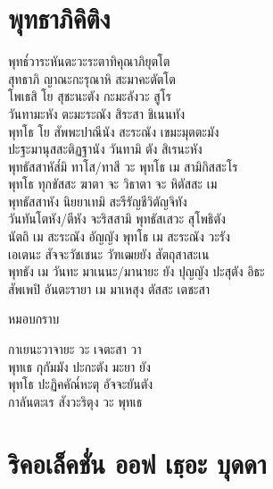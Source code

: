 \chapter{พุทธาภิคิติง}

\begin{leader}
\end{leader}

\begin{thaitrans}
พุทธ๎วาระหันตะวะระตาทิคุณาภิยุตโต\\
สุทธาภิ ญาณะกะรุณาหิ สะมาคะตัตโต\\
โพเธสิ โย สุชะนะตัง กะมะลังวะ สูโร\\
วันทามะหัง ตะมะระณัง สิระสา ชิเนนทัง\\
พุทโธ โย สัพพะปาณีนัง สะระณัง เขมะมุตตะมัง\\
ปะฐะมานุสสะติฏฐานัง วันทามิ ตัง สิเรนะหัง\\
พุทธัสสาหัส๎มิ ทาโส/ทาสี วะ พุทโธ เม สามิกิสสะโร\\
พุทโธ ทุกขัสสะ ฆาตา จะ วิธาตา จะ หิตัสสะ เม\\
พุทธัสสาหัง นิยยาเทมิ สะรีรัญชีวิตัญจิทัง\\
วันทันโตหัง/ตีหัง จะริสสามิ พุทธัสเสวะ สุโพธิตัง\\
นัตถิ เม สะระณัง อัญญัง พุทโธ เม สะระณัง วะรัง\\
เอเตนะ สัจจะวัชเชนะ วัฑเฒยยัง สัตถุสาสะเน\\
พุทธัง เม วันทะ มาเนนะ/มานายะ ยัง ปุญญัง ปะสุตัง อิธะ\\
สัพเพปิ อันตะรายา เม มาเหสุง ตัสสะ เตชะสา\\
\end{thaitrans}

\begin{instruction}
หมอบกราบ
\end{instruction}

\begin{thaitrans}
กาเยนะวาจายะ วะ เจตะสา วา\\
พุทเธ กุกัมมัง ปะกะตัง มะยา ยัง\\
พุทโธ ปะฏิคคัณ๎หะตุ อัจจะยันตัง\\
กาลันตะเร สังวะริตุง วะ พุทเธ
\end{thaitrans}

\clearpage

\chapter{ริคอเล็คชั่น ออฟ เธฺอะ บุดดา}

